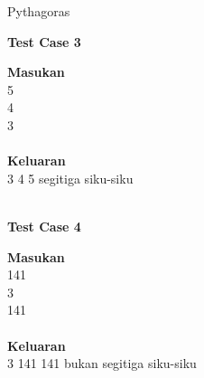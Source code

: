 \begin{permasalahan}{Pythagoras}
	\begin{center}
	\textbf{Test Case 3}\\
	\end{center}
	\textbf{Masukan}\\
	5 \\
	4 \\
	3 \\\\
	\textbf{Keluaran}\\
	3 4 5 segitiga siku-siku \\\\
	
	\begin{center}
	\textbf{Test Case 4}\\
	\end{center}
	\textbf{Masukan}\\
	141 \\
	3 \\
	141 \\\\
	\textbf{Keluaran}\\
	3 141 141 bukan segitiga siku-siku \\	
\end{permasalahan}



